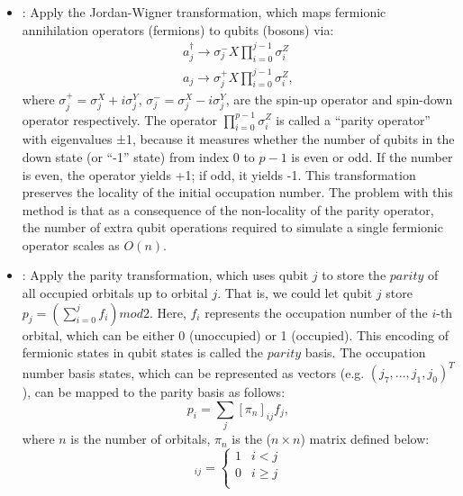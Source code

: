 \begin{itemize}
    \item \methodjordanwigner: Apply the Jordan-Wigner transformation, which maps fermionic annihilation operators (fermions) to qubits (bosons) via:
          \begin{equation}
              \begin{split}
                  a_j^{\dagger} \to {\sigma}_j^{-} X \prod_{i=0}^{j-1} {\sigma}^Z_i \\
                  a_j \to {\sigma}_j^{+} X \prod_{i=0}^{j-1} {\sigma}^Z_i,
              \end{split}
          \end{equation}
          where ${\sigma}_j^{+} = {\sigma}_j^X+i{\sigma}_j^Y$, ${\sigma}_j^{-} = {\sigma}_j^X-i{\sigma}_j^Y$, are the spin-up operator and spin-down operator respectively. The operator $\prod_{i=0}^{p-1} {{\sigma}^Z_i}$ is called a “parity operator” with eigenvalues ±1, because it measures whether the number of qubits in the down state (or “-1” state) from index 0 to $p-1$ is even or odd. If the number is even, the operator yields +1; if odd, it yields -1. This transformation preserves the locality of the initial occupation number. The problem with this method is that as a consequence of the non-locality of the parity operator, the number of extra qubit operations required to simulate a single fermionic operator scales as $O(n)$.
    \item \methodparity: Apply the parity transformation, which uses qubit $j$ to store the $parity$ of all occupied orbitals up to orbital $j$. That is, we could let qubit $j$ store $p_j = (\sum_{i=0}^j f_i) mod 2$. Here, $f_i$ represents the occupation number of the $i$-th orbital, which can be either 0 (unoccupied) or 1 (occupied). This encoding of fermionic states in qubit states is called the $parity$ basis. The occupation number basis states, which can be represented as vectors (e.g. $(j_7,...,j_1,j_0)^T$), can be mapped to the parity basis as follows:
          \begin{equation}
              p_i = \sum_j {[\pi_n]_{ij} f_j},
          \end{equation}
          where $n$ is the number of orbitals, $\pi_n$ is the ($n \times n$) matrix defined below:
          \begin{equation}
              [\pi_n]_{ij} =
              \begin{cases}
                  1 & i<j     \\
                  0 & i\geq j \\

\end{cases}
\end{equation}
\end{itemize}
